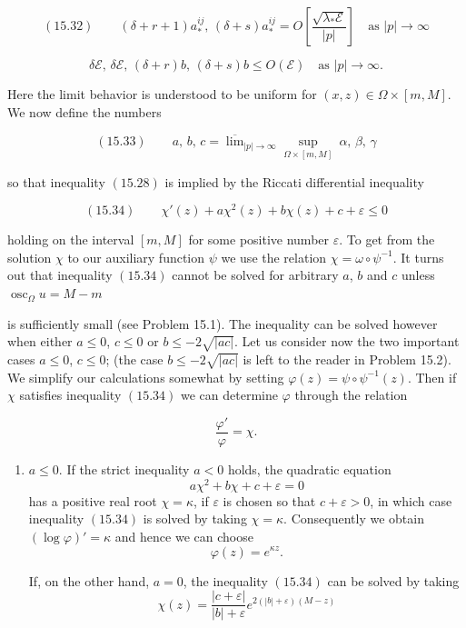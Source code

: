 \begin{equation}
(15.32)\qquad (\delta+r+1)a^{ij}_{*},\,(\delta+s)a^{ij}_{*}=O\!\left[\frac{\sqrt{\lambda_{*}\mathcal{E}}}{|p|}\right]
\quad\text{as }|p|\to\infty
\end{equation}

\[
\delta\mathcal{E},\,\delta\mathcal{E},\,(\delta+r)b,\,(\delta+s)b \le O(\mathcal{E}) \quad \text{as }|p|\to\infty.
\]

Here the limit behavior is understood to be uniform for $(x,z)\in \Omega\times [m,M]$. We now define the numbers

\begin{equation}
(15.33)\qquad a,\,b,\,c = \overline{\lim}_{|p|\to\infty}\sup_{\Omega\times [m,M]}\ \alpha,\,\beta,\,\gamma
\end{equation}

so that inequality $(15.28)$ is implied by the Riccati differential inequality

\begin{equation}
(15.34)\qquad \chi'(z)+a\chi^{2}(z)+b\chi(z)+c+\varepsilon\le 0
\end{equation}

holding on the interval $[m,M]$ for some positive number $\varepsilon$. To get from the solution $\chi$ to our auxiliary function $\psi$ we use the relation $\chi=\omega\circ\psi^{-1}$. It turns out that inequality $(15.34)$ cannot be solved for arbitrary $a$, $b$ and $c$ unless $\operatorname{osc}_{\Omega}u=M-m$

is sufficiently small (see Problem 15.1). The inequality can be solved however when either $a\le 0$, $c\le 0$ or $b\le -2\sqrt{|ac|}$. Let us consider now the two important cases $a\le 0$, $c\le 0$; (the case $b\le -2\sqrt{|ac|}$ is left to the reader in Problem 15.2). We simplify our calculations somewhat by setting $\varphi(z)=\psi\circ\psi^{-1}(z)$. Then if $\chi$ satisfies inequality $(15.34)$ we can determine $\varphi$ through the relation

\[
\frac{\varphi'}{\varphi}=\chi.
\]

\begin{enumerate}
\item[(i)] $a\le 0$. If the strict inequality $a<0$ holds, the quadratic equation
\[
a\chi^{2}+b\chi+c+\varepsilon=0
\]
has a positive real root $\chi=\kappa$, if $\varepsilon$ is chosen so that $c+\varepsilon>0$, in which case inequality $(15.34)$ is solved by taking $\chi=\kappa$. Consequently we obtain $(\log \varphi)'=\kappa$ and hence we can choose
\[
\varphi(z)=e^{\kappa z}.
\]

If, on the other hand, $a=0$, the inequality $(15.34)$ can be solved by taking
\[
\chi(z)=\frac{|c+\varepsilon|}{|b|+\varepsilon}e^{2(|b|+\varepsilon)(M-z)}
\]
\end{enumerate}


